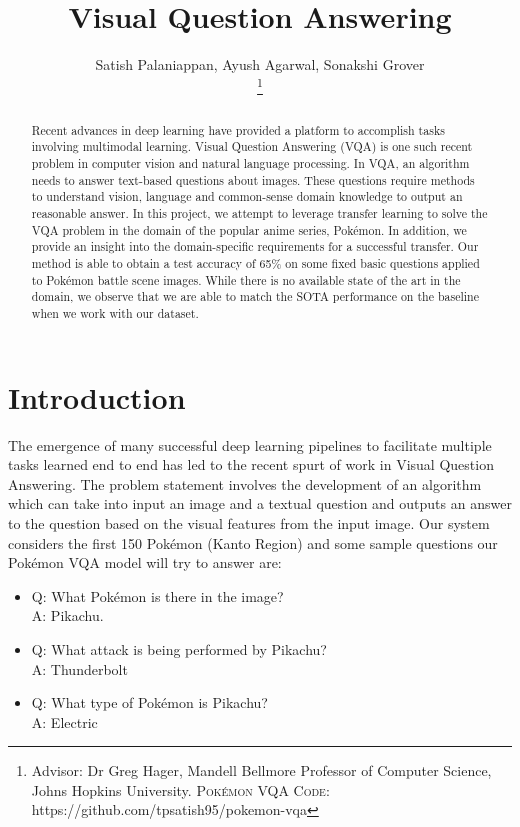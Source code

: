 \documentclass[journal, a4paper]{IEEEtran}
\begin{document}
	\title{Visual Question Answering}
	\author{Satish Palaniappan, Ayush Agarwal, Sonakshi Grover

	\thanks{Advisor: Dr Greg Hager, Mandell Bellmore Professor of Computer Science, Johns Hopkins University. \newline 
	\textsc{Pok\'emon VQA Code:} https://github.com/tpsatish95/pokemon-vqa}}
	\maketitle

\begin{abstract}
	Recent advances in deep learning have provided a platform to accomplish tasks involving multimodal learning. Visual Question Answering (VQA) is one such recent problem in computer vision and natural language processing. In VQA, an algorithm needs to answer text-based questions about images. These questions require methods to understand vision, language and common-sense domain knowledge to output an reasonable answer. In this project, we attempt to leverage transfer learning to solve the VQA problem in the domain of the popular anime series, Pok\'emon. In addition, we provide an insight into the domain-specific requirements for a successful transfer. Our method is able to obtain a test accuracy of 65\% on some fixed basic questions applied to Pok\'emon battle scene images. While there is no available state of the art in the domain, we observe that we are able to match the SOTA performance on the baseline when we work with our dataset. 
\end{abstract}

\section{Introduction}
	The emergence of many successful deep learning pipelines to facilitate multiple tasks learned end to end has led to the recent spurt of work in Visual Question Answering. The problem statement involves the development of an algorithm which can take into input an image and a textual question and outputs an answer to the question based on the visual features from the input image. Our system considers the first 150 Pok\'emon (Kanto Region) and some sample questions our Pok\'emon VQA model will try to answer are:
	\begin{itemize}
	    \item Q: What Pok\'emon is there in the image? \\A: Pikachu.
	    \item Q: What attack is being performed by Pikachu? \\A: Thunderbolt
	    \item Q: What type of Pok\'emon is Pikachu? \\A: Electric
	\end{itemize}
	    
\end{document}
